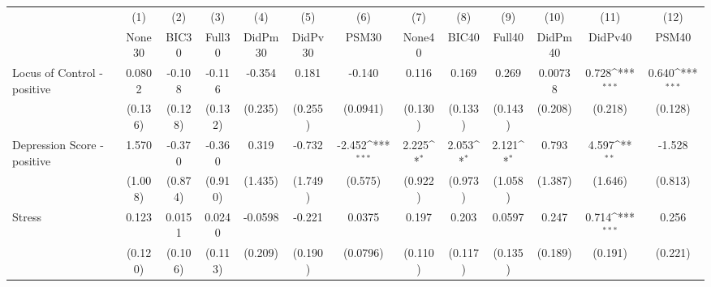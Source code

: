{
\def\sym#1{\ifmmode^{#1}\else\(^{#1}\)\fi}
\begin{tabular}{l*{12}{c}}
\toprule
            &\multicolumn{1}{c}{(1)}&\multicolumn{1}{c}{(2)}&\multicolumn{1}{c}{(3)}&\multicolumn{1}{c}{(4)}&\multicolumn{1}{c}{(5)}&\multicolumn{1}{c}{(6)}&\multicolumn{1}{c}{(7)}&\multicolumn{1}{c}{(8)}&\multicolumn{1}{c}{(9)}&\multicolumn{1}{c}{(10)}&\multicolumn{1}{c}{(11)}&\multicolumn{1}{c}{(12)}\\
            &\multicolumn{1}{c}{None30}&\multicolumn{1}{c}{BIC30}&\multicolumn{1}{c}{Full30}&\multicolumn{1}{c}{DidPm30}&\multicolumn{1}{c}{DidPv30}&\multicolumn{1}{c}{PSM30}&\multicolumn{1}{c}{None40}&\multicolumn{1}{c}{BIC40}&\multicolumn{1}{c}{Full40}&\multicolumn{1}{c}{DidPm40}&\multicolumn{1}{c}{DidPv40}&\multicolumn{1}{c}{PSM40}\\
\midrule
Locus of Control - positive&      0.0802         &      -0.108         &      -0.116         &      -0.354         &       0.181         &      -0.140         &       0.116         &       0.169         &       0.269         &     0.00738         &       0.728\sym{***}&       0.640\sym{***}\\
            &     (0.136)         &     (0.128)         &     (0.132)         &     (0.235)         &     (0.255)         &    (0.0941)         &     (0.130)         &     (0.133)         &     (0.143)         &     (0.208)         &     (0.218)         &     (0.128)         \\
\addlinespace
Depression Score - positive&       1.570         &      -0.370         &      -0.360         &       0.319         &      -0.732         &      -2.452\sym{***}&       2.225\sym{*}  &       2.053\sym{*}  &       2.121\sym{*}  &       0.793         &       4.597\sym{**} &      -1.528         \\
            &     (1.008)         &     (0.874)         &     (0.910)         &     (1.435)         &     (1.749)         &     (0.575)         &     (0.922)         &     (0.973)         &     (1.058)         &     (1.387)         &     (1.646)         &     (0.813)         \\
\addlinespace
Stress      &       0.123         &      0.0151         &      0.0240         &     -0.0598         &      -0.221         &      0.0375         &       0.197         &       0.203         &      0.0597         &       0.247         &       0.714\sym{***}&       0.256         \\
            &     (0.120)         &     (0.106)         &     (0.113)         &     (0.209)         &     (0.190)         &    (0.0796)         &     (0.110)         &     (0.117)         &     (0.135)         &     (0.189)         &     (0.191)         &     (0.221)         \\

\end{tabular}}
